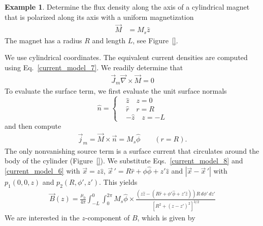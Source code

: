\documentclass[11pt,a4paper,oneside]{book}
\numberwithin{equation}{section}
\newcommand{\abs}[1]{\left|#1\right|}
\theoremstyle{it}
\theoremstyle{definition}
\newtheorem{example}{Example}[section]
\begin{document}
\begin{example}
	Determine the flux density along the axis of a cylindrical magnet that is polarized along its axis with a uniform magnetization
	\begin{equation*}\label{}
		\begin{aligned}
				\vec{M} &= M_s\hat{z}
		\end{aligned}
	\end{equation*}
The magnet has a radius $R$ and length $L$, see Figure~\ref{}.

We use cylindrical coordinates. The equivalent current densities are computed using Eq.~\eqref{current_model_7}. We readily determine that 
\begin{equation}\label{current_model_8}
\begin{aligned}
	\vec{J}_m \vec{\nabla} \times \vec{M}= 0
\end{aligned}
\end{equation}
To evaluate the surface term, we first evaluate the unit surface normals 
\begin{equation*}\label{}
	\hat{n}=\left\lbrace 
	\begin{aligned}
		&\hat{z}\quad z=0 \\[6pt]	
		&\hat{r}\quad r=R \\[6pt]	
		&-\hat{z}\quad z=-L 
	\end{aligned}\right. 
\end{equation*}
and then compute
\begin{equation}\label{current_model_9}
	\begin{aligned}
		\vec{j}_m = \vec{M} \times \vec{n}= M_s\hat{\phi}\qquad(r=R).
	\end{aligned}
\end{equation}
The only nonvanishing source term is a surface current that circulates around the body of the cylinder (Figure~\ref{}). We substitute Eqs.~\eqref{current_model_8} and \ref{current_model_6} with $\vec{x}=z\hat{z}$, $\vec{x}\,'=R\hat{r}+\phi\hat{\phi}+z'\hat{z}$ and $\abs{\vec{x}-\vec{x}\,'}$ with $p_1(0,0,z)$ and $p_2(R,\phi',z')$. This yields
\begin{equation*}\label{}
	\begin{aligned}
		\vec{B}(z) = \frac{\mu_0}{4\pi}\int_{-L}^{0}\int_{0}^{2\pi} M_s\hat{\phi}\times\frac{(z\hat{z}-(R\hat{r}+\phi'\hat{\phi}+z'\hat{z}))R\,d\phi'\,dz'}{[R^2+(z-z')^2]^{3/2}}
	\end{aligned}
\end{equation*}
We are interested in the $z$-component of $B$, which is given by

\end{example}
\end{document}
